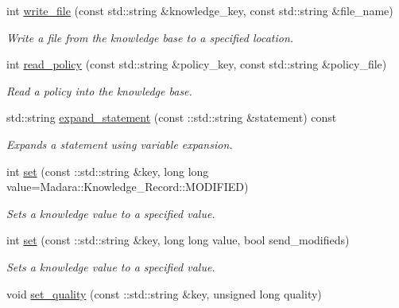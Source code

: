 \begin{DoxyCompactItemize}
int \hyperlink{classMadara_1_1Knowledge__Engine_1_1Knowledge__Base_aa940b7a5686f30d03abac08687bf1d6a}{write\_\-file} (const std::string \&knowledge\_\-key, const std::string \&file\_\-name)
\begin{DoxyCompactList}\small\item\em Write a file from the knowledge base to a specified location. \item\end{DoxyCompactList}\item 
int \hyperlink{classMadara_1_1Knowledge__Engine_1_1Knowledge__Base_a448f8b65bb14a1770e594614ade17366}{read\_\-policy} (const std::string \&policy\_\-key, const std::string \&policy\_\-file)
\begin{DoxyCompactList}\small\item\em Read a policy into the knowledge base. \item\end{DoxyCompactList}\item 
std::string \hyperlink{classMadara_1_1Knowledge__Engine_1_1Knowledge__Base_a99d8b395aefdb1c0ed218a715ee368c4}{expand\_\-statement} (const ::std::string \&statement) const 
\begin{DoxyCompactList}\small\item\em Expands a statement using variable expansion. \item\end{DoxyCompactList}\item 
int \hyperlink{classMadara_1_1Knowledge__Engine_1_1Knowledge__Base_a81fa8bdc003afe0ecedd06ca8370fbda}{set} (const ::std::string \&key, long long value=Madara::Knowledge\_\-Record::MODIFIED)
\begin{DoxyCompactList}\small\item\em Sets a knowledge value to a specified value. \item\end{DoxyCompactList}\item 
int \hyperlink{classMadara_1_1Knowledge__Engine_1_1Knowledge__Base_ae6e630a68b67196c333784e6545004ea}{set} (const ::std::string \&key, long long value, bool send\_\-modifieds)
\begin{DoxyCompactList}\small\item\em Sets a knowledge value to a specified value. \item\end{DoxyCompactList}\item 
void \hyperlink{classMadara_1_1Knowledge__Engine_1_1Knowledge__Base_aab81dc606fe8ec5904bf292eaefae951}{set\_\-quality} (const ::std::string \&key, unsigned long quality)

\end{DoxyCompactItemize}
